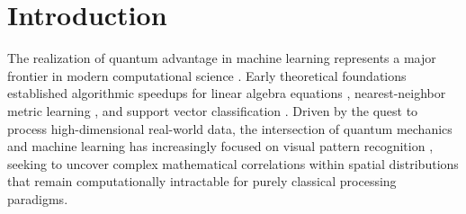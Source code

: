 \documentclass[pdflatex,sn-mathphys-num]{sn-jnl}%
\theoremstyle{thmstyleone}%
\theoremstyle{thmstyletwo}%
\theoremstyle{thmstylethree}%
\begin{document}

\maketitle

\section{Introduction}
The realization of quantum advantage in machine learning represents a major frontier in modern computational science \cite{biamonte2017quantum, schuld2015introduction, dunjko2018machine, cerezo2021variational, lloyd2020quantum}. Early theoretical foundations established algorithmic speedups for linear algebra equations \cite{harrow2009quantum}, nearest-neighbor metric learning \cite{wiebe2012quantum}, and support vector classification \cite{rebentrost2014quantum}. Driven by the quest to process high-dimensional real-world data, the intersection of quantum mechanics and machine learning has increasingly focused on visual pattern recognition \cite{cong2019quantum, henderson2020quanvolutional, chen2023qcnn}, seeking to uncover complex mathematical correlations within spatial distributions that remain computationally intractable for purely classical processing paradigms.
\end{document}

